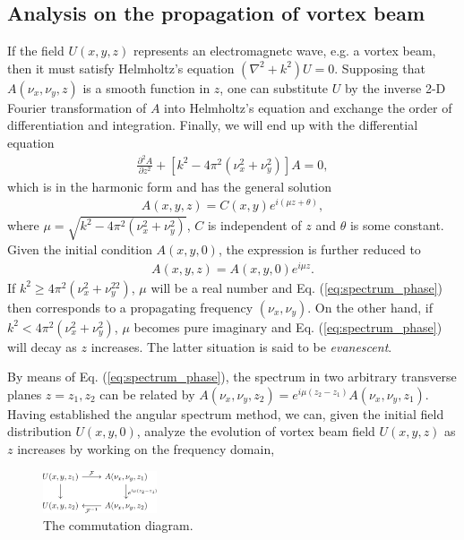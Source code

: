 \subsection{Analysis on the propagation of vortex beam}
If the field $U(x, y, z)$ represents an electromagnetc wave, e.g. a vortex beam, then it must satisfy Helmholtz's equation $(\nabla^2 + k^2) U  = 0$. Supposing that $A(\nu_x, \nu_y, z)$ is a smooth function in $z$, one can substitute $U$ by the inverse 2-D Fourier transformation of $A$ into Helmholtz's equation and exchange the order of differentiation and integration. Finally, we will end up with the differential equation
\begin{eqnarray}
	\frac{\partial^2 A}{\partial z^2} + \left[ k^2 - 4\pi^2\left( \nu_x^2 + \nu_y^2 \right) \right] A= 0,
	\nonumber
\end{eqnarray}
which is in the harmonic form and has the general solution
\begin{eqnarray}
	A(x, y, z) = C(x, y) e^{i (\mu z + \theta)},
	\nonumber
\end{eqnarray}
where $\mu = \sqrt{k^2 - 4\pi^2\left( \nu_x^2 + \nu_y^2 \right)}$, $C$ is independent of $z$ and $\theta$ is some constant. Given the initial condition $A(x, y, 0)$, the expression is further reduced to
\begin{eqnarray}
	A(x, y, z) = A(x, y, 0) e^{i \mu z}.
	\label{eq:spectrum_phase}
\end{eqnarray}
If $k^2 \ge 4\pi^2 (\nu_x^2 + \nu_y^22)$, $\mu$ will be a real number and Eq. (\ref{eq:spectrum_phase}) then corresponds to a propagating frequency $(\nu_x, \nu_y)$. On the other hand, if $k^2 < 4\pi^2 (\nu_x^2 + \nu_y^2)$, $\mu$ becomes pure imaginary and Eq. (\ref{eq:spectrum_phase}) will decay as $z$ increases. The latter situation is said to be {\em evanescent}.

By means of Eq. (\ref{eq:spectrum_phase}), the spectrum in two arbitrary transverse planes $z = z_1, z_2$ can be related by $A(\nu_x, \nu_y, z_2) = e^{i \mu (z_2 - z_1)} A(\nu_x, \nu_y, z_1)$. Having established the angular spectrum method, we can, given the initial field distribution $U(x, y, 0)$, analyze the evolution of vortex beam field $U(x, y, z)$ as $z$ increases by working on the frequency domain,

\begin{figure}
	\centering
	\includegraphics[width = 0.3\textwidth]{cd.jpg}
	\caption{The commutation diagram.}
\end{figure}

